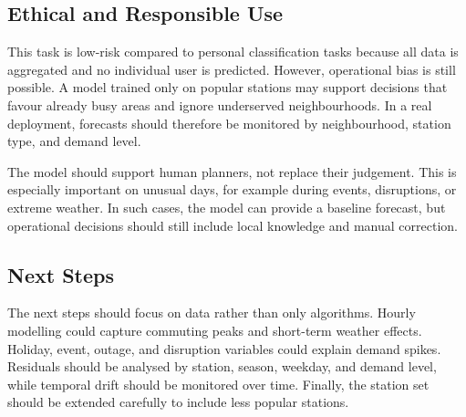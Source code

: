 \subsection{Ethical and Responsible Use}

This task is low-risk compared to personal classification tasks 
because all data is aggregated and no individual user is predicted. 
However, operational bias is still possible. A model trained only 
on popular stations may support decisions that favour already busy 
areas and ignore underserved neighbourhoods. In a real deployment, 
forecasts should therefore be monitored by neighbourhood, station type, 
and demand level.

The model should support human planners, not replace their judgement. 
This is especially important on unusual days, for example during 
events, disruptions, or extreme weather. In such cases, the model can 
provide a baseline forecast, but operational decisions should still 
include local knowledge and manual correction.

\subsection{Next Steps}

The next steps should focus on data rather than only algorithms. Hourly 
modelling could capture commuting peaks and short-term weather effects. 
Holiday, event, outage, and disruption variables could explain demand 
spikes. Residuals should be analysed by station, season, weekday, and 
demand level, while temporal drift should be monitored over time. Finally, 
the station set should be extended carefully to include less popular 
stations.